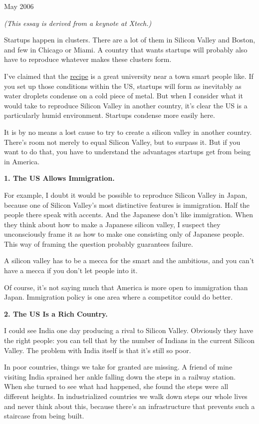 \documentclass[12pt]{book}
\begin{document}
May 2006

\emph{(This essay is derived from a keynote at Xtech.)}

Startups happen in clusters. There are a lot of them in Silicon Valley
and Boston, and few in Chicago or Miami. A country that wants startups
will probably also have to reproduce whatever makes these clusters form.

I've claimed that the \href{siliconvalley.html}{recipe} is a great
university near a town smart people like. If you set up those conditions
within the US, startups will form as inevitably as water droplets
condense on a cold piece of metal. But when I consider what it would
take to reproduce Silicon Valley in another country, it's clear the US
is a particularly humid environment. Startups condense more easily here.

It is by no means a lost cause to try to create a silicon valley in
another country. There's room not merely to equal Silicon Valley, but to
surpass it. But if you want to do that, you have to understand the
advantages startups get from being in America.

\textbf{1. The US Allows Immigration.}

For example, I doubt it would be possible to reproduce Silicon Valley in
Japan, because one of Silicon Valley's most distinctive features is
immigration. Half the people there speak with accents. And the Japanese
don't like immigration. When they think about how to make a Japanese
silicon valley, I suspect they unconsciously frame it as how to make one
consisting only of Japanese people. This way of framing the question
probably guarantees failure.

A silicon valley has to be a mecca for the smart and the ambitious, and
you can't have a mecca if you don't let people into it.

Of course, it's not saying much that America is more open to immigration
than Japan. Immigration policy is one area where a competitor could do
better.

\textbf{2. The US Is a Rich Country.}

I could see India one day producing a rival to Silicon Valley. Obviously
they have the right people: you can tell that by the number of Indians
in the current Silicon Valley. The problem with India itself is that
it's still so poor.

In poor countries, things we take for granted are missing. A friend of
mine visiting India sprained her ankle falling down the steps in a
railway station. When she turned to see what had happened, she found the
steps were all different heights. In industrialized countries we walk
down steps our whole lives and never think about this, because there's
an infrastructure that prevents such a staircase from being built.
\end{document}
